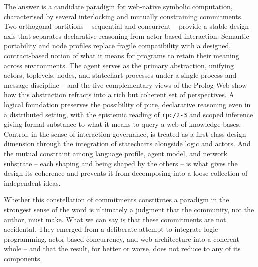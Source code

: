 The answer is a candidate paradigm for web-native symbolic computation,
characterised by several interlocking and mutually constraining
commitments. Two orthogonal partitions -- sequential and concurrent --
provide a stable design axis that separates declarative reasoning from
actor-based interaction. Semantic portability and node profiles replace
fragile compatibility with a designed, contract-based notion of what it
means for programs to retain their meaning across environments. The
agent serves as the primary abstraction, unifying actors, toplevels,
nodes, and statechart processes under a single process-and-message
discipline -- and the five complementary views of the Prolog Web show
how this abstraction refracts into a rich but coherent set of
perspectives. A logical foundation preserves the possibility of pure,
declarative reasoning even in a distributed setting, with the epistemic
reading of \texttt{rpc/2-3} and scoped inference giving formal substance
to what it means to query a web of knowledge bases. Control, in the
sense of interaction governance, is treated as a first-class design
dimension through the integration of statecharts alongside logic and
actors. And the mutual constraint among language profile, agent model,
and network substrate -- each shaping and being shaped by the others --
is what gives the design its coherence and prevents it from decomposing
into a loose collection of independent ideas.

Whether this constellation of commitments constitutes a paradigm in the
strongest sense of the word is ultimately a judgment that the community,
not the author, must make. What we can say is that these commitments are
not accidental. They emerged from a deliberate attempt to integrate
logic programming, actor-based concurrency, and web architecture into a
coherent whole -- and that the result, for better or worse, does not
reduce to any of its components.
